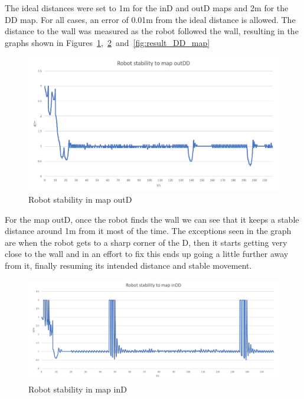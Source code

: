 \documentclass[10pt,journal,compsoc]{IEEEtran}
\begin{document}
The ideal distances were set to 1m for the inD and outD maps and 2m for the DD map. For all cases, an error of 0.01m from the ideal distance is allowed. The distance to the wall was measured as the robot followed the wall, resulting in the graphs shown in Figures~\ref{fig:result_outD_map},~\ref{fig:result_inD_map}~and~\ref{fig:result_DD_map}

\begin{figure}[thpb]
\centering
\includegraphics[scale=0.2]{img/map_outD.jpg}
\caption{Robot stability in map outD}
\label{fig:result_outD_map}
\end{figure}

For the map outD, once the robot finds the wall we can see that it keeps a stable distance around 1m from it most of the time. The exceptions seen in the graph are when the robot gets to a sharp corner of the D, then it starts getting very close to the wall and in an effort to fix this ends up going a little further away from it, finally resuming its intended distance and stable movement.

\begin{figure}[thpb]
\centering
\includegraphics[scale=0.16]{img/map_inD.jpg}
\caption{Robot stability in map inD}
\label{fig:result_inD_map}
\end{figure}
\end{document}
